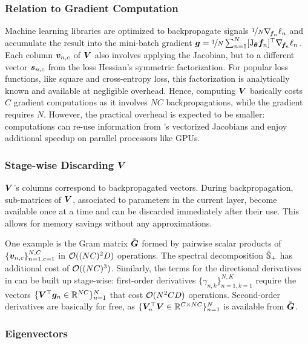 \subsubsection{Relation to Gradient Computation}
Machine learning libraries are optimized to backpropagate signals
$\nicefrac{1}{N} \nabla_{\!{{\bm{f}}_n}} \ell_n$ and accumulate the result into the
mini-batch gradient ${\bm{g}} = \nicefrac{1}{N} \sum_{n=1}^N[\mathrm{J}_{{\bm{\theta}}} {\bm{f}}_n
]^\top \nabla_{\!{{\bm{f}}_n}} \ell_n$. Each column ${\bm{v}}_{n,c}$ of ${\bm{V}}$ also involves
applying the Jacobian, but to a different vector ${\bm{s}}_{n,c}$ from the loss
Hessian's symmetric factorization. For popular loss functions, like square and
cross-entropy loss, this factorization is analytically known and available at
negligible overhead. Hence, computing ${\bm{V}}$ basically costs $C$ gradient
computations as it involves $NC$ backpropagations, while the gradient requires
$N$. However, the practical overhead is expected to be smaller: computations can
re-use information from \backpack's vectorized Jacobians and enjoy additional
speedup on parallel processors like GPUs.

\subsubsection{Stage-wise Discarding ${\bm{V}}$}

${\bm{V}}$'s columns correspond to backpropagated vectors. During
backpropagation, sub-matrices of ${\bm{V}}$, associated to parameters in the current
layer, become available once at a time and can be discarded immediately after
their use. This allows for memory savings without any approximations.

One example is the Gram matrix $\bm{\tilde{{\bm{G}}}}$ formed by pairwise scalar products of
$\{{\bm{v}}_{n,c}\}_{n=1,c=1}^{N, C}$ in ${\mathcal{O}}((NC)^2D)$ operations. The spectral
decomposition $\tilde{{\mathbb{S}}}_+$ has additional cost of ${\mathcal{O}}((NC)^3)$. Similarly,
the terms for the directional derivatives in  can be
built up stage-wise: first-order derivatives $\{\gamma_{n,k}\}_{n=1,k=1}^{N,K}$
require the vectors $\{ {\bm{V}}^\top {\bm{g}}_n \in {\mathbb{R}}^{NC} \}_{n=1}^N$ that cost
${\mathcal{O}}(N^2CD)$ operations. Second-order derivatives are basically for free, as $\{
{\bm{V}}_n^\top {\bm{V}} \in {\mathbb{R}}^{C\times NC} \}_{n=1}^N$ is available from $\bm{\tilde{{\bm{G}}}}$.

\subsubsection{\ggn Eigenvectors}

